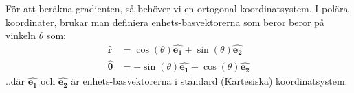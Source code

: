 \documentclass{report}
\begin{document}
{
	För att beräkna gradienten, så behöver vi en ortogonal koordinatsystem. I polära koordinater, brukar man definiera enhets-basvektorerna som beror beror på vinkeln $\theta$ som:
	\begin{align*}
		\boldsymbol{\hat{r}} &= \cos(\theta)\boldsymbol{\hat{e_1}}+\sin(\theta)\boldsymbol{\hat{e_2}}\\
		\boldsymbol{\hat{\theta}} &= -\sin(\theta)\boldsymbol{\hat{e_1}} + \cos(\theta)\boldsymbol{\hat{e_2}}
	\end{align*}
	..där $\boldsymbol{\hat{e_1}}$ och $\boldsymbol{\hat{e_2}}$ är enhets-basvektorerna i standard (Kartesiska) koordinatsystem.\\\\
	
}
\end{document}
